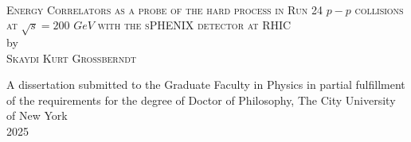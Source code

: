 \begin{titlepage}

\begin{center}

~\vspace{2in}

\textsc{Energy Correlators as a probe of the hard process in Run 24 $p-p$ collisions at $\sqrt{s}=200$ $GeV$ with the sPHENIX detector at RHIC} \\[0.5in]
by \\[0.5in]
\textsc{Skaydi Kurt Grossberndt} 

\vspace{\fill}
A dissertation submitted to the Graduate Faculty in Physics in partial fulfillment of the requirements for the degree of Doctor of Philosophy, The City University of New York \\[0.25in]
2025

\end{center}

\end{titlepage}
